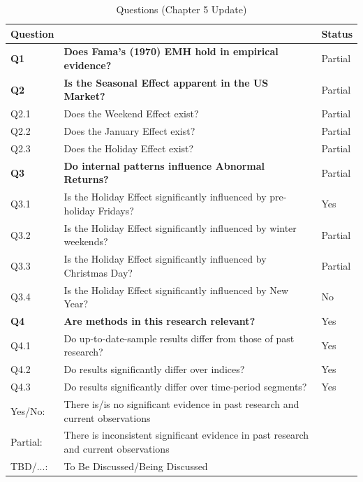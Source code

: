 \documentclass[11pt, english]{article}
\begin{document}
	\begin{table}[h]
		\scriptsize
		\renewcommand{\arraystretch}{1.25}
        \begin{center}
        \begin{tabular}{lll}
        	\textbf{Question} & & \textbf{Status} \\ 
        	\hline
        	\textbf{Q1} & \textbf{Does Fama’s (1970) EMH hold in empirical evidence?} & Partial\\
                \textbf{Q2} & \textbf{Is the Seasonal Effect apparent in the US Market?} & Partial\\
        	Q2.1 & Does the Weekend Effect exist? & Partial\\
                Q2.2 & Does the January Effect exist? & Partial\\
                Q2.3 & Does the Holiday Effect exist? & Partial\\
                \textbf{Q3} & \textbf{Do internal patterns influence Abnormal Returns?} & Partial\\
                Q3.1 & Is the Holiday Effect significantly influenced by pre-holiday Fridays? & Yes\\
                Q3.2 & Is the Holiday Effect significantly influenced by winter weekends? & Partial\\
                Q3.3 & Is the Holiday Effect significantly influenced by Christmas Day? & Partial\\
                Q3.4 & Is the Holiday Effect significantly influenced by New Year? & No\\
                \textbf{Q4} & \textbf{Are methods in this research relevant?} & Yes\\
                Q4.1 & Do up-to-date-sample results differ from those of past research? & Yes\\
                Q4.2 & Do results significantly differ over indices? & Yes\\
                Q4.3 & Do results significantly differ over time-period segments? & Yes\\
                \hline
                Yes/No: & There is/is no significant evidence in past research and current observations \\
                Partial: & There is inconsistent significant evidence in past research and current observations \\
                TBD/...: & To Be Discussed/Being Discussed \\
                \hline
        \end{tabular}                            
                \caption {Questions (Chapter 5 Update)}
        \end{center}
	\end{table}
\end{document}
